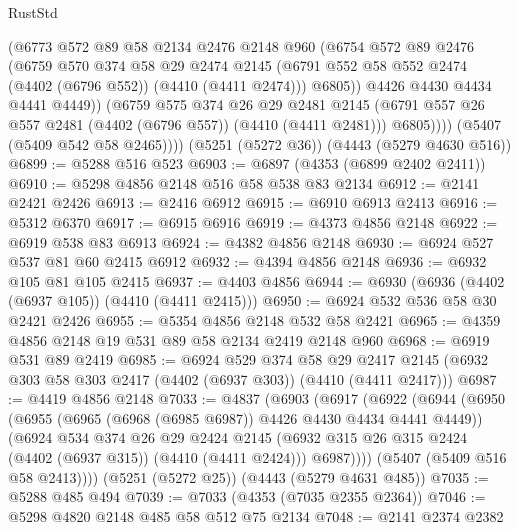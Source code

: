 \begin{lexlean}{RustStd}
\begin{coremodule}
                (@6773
                  @572
                  @89
                  @58
                  @2134
                  @2476
                  @2148
                  @960
                  (@6754
                    @572
                    @89
                    @2476
                    (@6759
                      @570
                      @374
                      @58
                      @29
                      @2474
                      @2145
                      (@6791 @552 @58 @552 @2474 (@4402 (@6796 @552)) (@4410 (@4411 @2474)))
                      @6805))
                  @4426
                  @4430
                  @4434
                  @4441
                  @4449))
              (@6759
                @575
                @374
                @26
                @29
                @2481
                @2145
                (@6791 @557 @26 @557 @2481 (@4402 (@6796 @557)) (@4410 (@4411 @2481)))
                @6805))))
        (@5407 (@5409 @542 @58 @2465))))
    (@5251 (@5272 @36))
    (@4443 (@5279 @4630 @516))
@6899 := @5288 @516 @523
@6903 := @6897 (@4353 (@6899 @2402 @2411))
@6910 := @5298 @4856 @2148 @516 @58 @538 @83 @2134
@6912 := @2141 @2421 @2426
@6913 := @2416 @6912
@6915 := @6910 @6913 @2413
@6916 := @5312 @6370
@6917 := @6915 @6916
@6919 := @4373 @4856 @2148
@6922 := @6919 @538 @83 @6913
@6924 := @4382 @4856 @2148
@6930 := @6924 @527 @537 @81 @60 @2415 @6912
@6932 := @4394 @4856 @2148
@6936 := @6932 @105 @81 @105 @2415
@6937 := @4403 @4856
@6944 := @6930 (@6936 (@4402 (@6937 @105)) (@4410 (@4411 @2415)))
@6950 := @6924 @532 @536 @58 @30 @2421 @2426
@6955 := @5354 @4856 @2148 @532 @58 @2421
@6965 := @4359 @4856 @2148 @19 @531 @89 @58 @2134 @2419 @2148 @960
@6968 := @6919 @531 @89 @2419
@6985 := @6924
    @529
    @374
    @58
    @29
    @2417
    @2145
    (@6932 @303 @58 @303 @2417 (@4402 (@6937 @303)) (@4410 (@4411 @2417)))
@6987 := @4419 @4856 @2148
@7033 := @4837
    (@6903
      (@6917
        (@6922
          (@6944
            (@6950
              (@6955 (@6965 (@6968 (@6985 @6987)) @4426 @4430 @4434 @4441 @4449))
              (@6924
                @534
                @374
                @26
                @29
                @2424
                @2145
                (@6932 @315 @26 @315 @2424 (@4402 (@6937 @315)) (@4410 (@4411 @2424)))
                @6987))))
        (@5407 (@5409 @516 @58 @2413))))
    (@5251 (@5272 @25))
    (@4443 (@5279 @4631 @485))
@7035 := @5288 @485 @494
@7039 := @7033 (@4353 (@7035 @2355 @2364))
@7046 := @5298 @4820 @2148 @485 @58 @512 @75 @2134
@7048 := @2141 @2374 @2382

\end{coremodule}
\end{lexlean}

